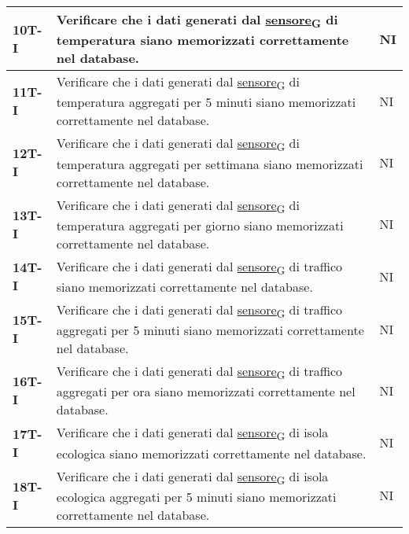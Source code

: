 \begin{longtable}{|>{\raggedright\arraybackslash}m{}|>{\raggedright\arraybackslash}m{}|>{\raggedright\arraybackslash}m{}|}
	\hline
	\textbf{10T-I}  & Verificare che i dati generati dal \href{https://7last.github.io/docs/rtb/documentazione-interna/glossario\#sensore}{sensore\textsubscript{G}} di temperatura siano memorizzati correttamente nel database.                              & NI             \\
	\hline
	\textbf{11T-I}  & Verificare che i dati generati dal \href{https://7last.github.io/docs/rtb/documentazione-interna/glossario\#sensore}{sensore\textsubscript{G}} di temperatura aggregati per 5 minuti siano memorizzati correttamente nel database.       & NI             \\
	\hline
	\textbf{12T-I}  & Verificare che i dati generati dal \href{https://7last.github.io/docs/rtb/documentazione-interna/glossario\#sensore}{sensore\textsubscript{G}} di temperatura aggregati per settimana siano memorizzati correttamente nel database.      & NI             \\
	\hline
	\textbf{13T-I}  & Verificare che i dati generati dal \href{https://7last.github.io/docs/rtb/documentazione-interna/glossario\#sensore}{sensore\textsubscript{G}} di temperatura aggregati per giorno siano memorizzati correttamente nel database.         & NI             \\
	\hline
	\textbf{14T-I}  & Verificare che i dati generati dal \href{https://7last.github.io/docs/rtb/documentazione-interna/glossario\#sensore}{sensore\textsubscript{G}} di traffico siano memorizzati correttamente nel database.                                 & NI             \\
	\hline
	\textbf{15T-I}  & Verificare che i dati generati dal \href{https://7last.github.io/docs/rtb/documentazione-interna/glossario\#sensore}{sensore\textsubscript{G}} di traffico aggregati per 5 minuti siano memorizzati correttamente nel database.          & NI             \\
	\hline
	\textbf{16T-I}  & Verificare che i dati generati dal \href{https://7last.github.io/docs/rtb/documentazione-interna/glossario\#sensore}{sensore\textsubscript{G}} di traffico aggregati per ora siano memorizzati correttamente nel database.               & NI             \\
	\hline
	\textbf{17T-I}  & Verificare che i dati generati dal \href{https://7last.github.io/docs/rtb/documentazione-interna/glossario\#sensore}{sensore\textsubscript{G}} di isola ecologica siano memorizzati correttamente nel database.                          & NI             \\
	\hline
	\textbf{18T-I}  & Verificare che i dati generati dal \href{https://7last.github.io/docs/rtb/documentazione-interna/glossario\#sensore}{sensore\textsubscript{G}} di isola ecologica aggregati per 5 minuti siano memorizzati correttamente nel database.   & NI             \\

\end{longtable}
